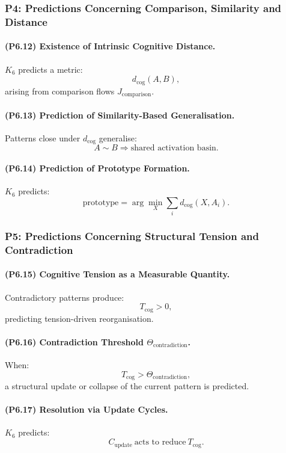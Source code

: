 \subsubsection{P4: Predictions Concerning Comparison, Similarity and Distance}

\paragraph{(P6.12) Existence of Intrinsic Cognitive Distance.}
$K_6$ predicts a metric:
\[
d_{\mathrm{cog}}(A,B),
\]
arising from comparison flows $J_{\mathrm{comparison}}$.

\paragraph{(P6.13) Prediction of Similarity-Based Generalisation.}
Patterns close under $d_{\mathrm{cog}}$ generalise:
\[
A \sim B \Rightarrow \text{shared activation basin}.
\]

\paragraph{(P6.14) Prediction of Prototype Formation.}
$K_6$ predicts:
\[
\text{prototype} = \arg\min_X \sum_i d_{\mathrm{cog}}(X, A_i).
\]

\subsubsection{P5: Predictions Concerning Structural Tension and Contradiction}

\paragraph{(P6.15) Cognitive Tension as a Measurable Quantity.}
Contradictory patterns produce:
\[
T_{\mathrm{cog}} > 0,
\]
predicting tension-driven reorganisation.

\paragraph{(P6.16) Contradiction Threshold $\Theta_{\mathrm{contradiction}}$.}
When:
\[
T_{\mathrm{cog}} > \Theta_{\mathrm{contradiction}},
\]
a structural update or collapse of the current pattern is predicted.

\paragraph{(P6.17) Resolution via Update Cycles.}
$K_6$ predicts:
\[
C_{\mathrm{update}} \ \text{acts to reduce} \ T_{\mathrm{cog}}.
\]

